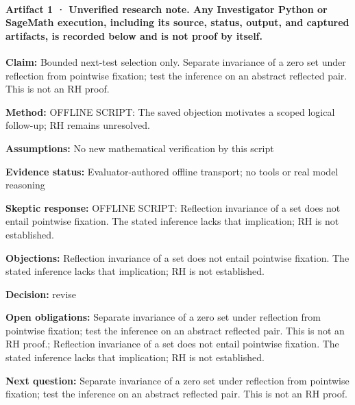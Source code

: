 \documentclass[11pt]{article}
\begin{document}
\paragraph{Artifact 1 · Unverified research note. Any Investigator Python or SageMath execution, including its source, status, output, and captured artifacts, is recorded below and is not proof by itself.}
\textbf{Claim:} Bounded next-test selection only. Separate invariance of a zero set under reflection from pointwise fixation; test the inference on an abstract reflected pair. This is not an RH proof.\par
\textbf{Method:} OFFLINE SCRIPT: The saved objection motivates a scoped logical follow-up; RH remains unresolved.\par
\textbf{Assumptions:} No new mathematical verification by this script\par
\textbf{Evidence status:} Evaluator-authored offline transport; no tools or real model reasoning\par
\textbf{Skeptic response:} OFFLINE SCRIPT: Reflection invariance of a set does not entail pointwise fixation. The stated inference lacks that implication; RH is not established.\par
\textbf{Objections:} Reflection invariance of a set does not entail pointwise fixation. The stated inference lacks that implication; RH is not established.\par
\textbf{Decision:} revise\par
\textbf{Open obligations:} Separate invariance of a zero set under reflection from pointwise fixation; test the inference on an abstract reflected pair. This is not an RH proof.; Reflection invariance of a set does not entail pointwise fixation. The stated inference lacks that implication; RH is not established.\par
\textbf{Next question:} Separate invariance of a zero set under reflection from pointwise fixation; test the inference on an abstract reflected pair. This is not an RH proof.\par
\end{document}
